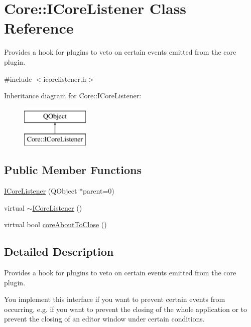 \hypertarget{class_core_1_1_i_core_listener}{\section{Core\-:\-:I\-Core\-Listener Class Reference}
\label{class_core_1_1_i_core_listener}
}


Provides a hook for plugins to veto on certain events emitted from the core plugin.  




{\ttfamily \#include $<$icorelistener.\-h$>$}

Inheritance diagram for Core\-:\-:I\-Core\-Listener\-:\begin{figure}[H]
\begin{center}
\leavevmode
\includegraphics[height=2.000000cm]{class_core_1_1_i_core_listener}
\end{center}
\end{figure}
\subsection*{Public Member Functions}
\begin{DoxyCompactItemize}
\item 
\hyperlink{group___core_plugin_gaae530a3c48fb9849eb9fee0f2616d665}{I\-Core\-Listener} (Q\-Object $\ast$parent=0)
\item 
virtual \hyperlink{group___core_plugin_ga2dbf8855d21d35851dc3dd795648b50b}{$\sim$\-I\-Core\-Listener} ()
\item 
virtual bool \hyperlink{group___core_plugin_ga234ba638cc5653d3bb183df5c9fe0ce2}{core\-About\-To\-Close} ()
\end{DoxyCompactItemize}


\subsection{Detailed Description}
Provides a hook for plugins to veto on certain events emitted from the core plugin. 

You implement this interface if you want to prevent certain events from occurring, e.\-g. if you want to prevent the closing of the whole application or to prevent the closing of an editor window under certain conditions.


